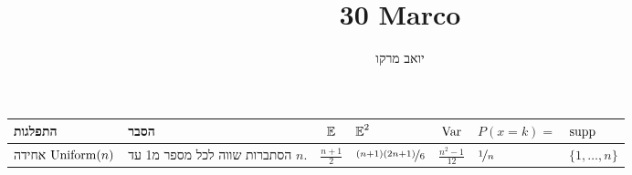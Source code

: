\documentclass[8pt,twocolumn]{extarticle}
\title{30 Marco}
\author{יואב מרקו}
\begin{document}
\ifxetex
{\centering
  { \begin{minipage}{\columnwidth}
      \centering
      \begin{sideways}
        \begin{tabular}{ R{1.7cm} | R{2.8cm} | c | C{2.1cm} | c | C{2.1cm} | C{1.5cm}}
          התפלגות  & הסבר
          & $\operatorname*{\mathbb{E}}$ & $\operatorname*{\mathbb{E}}^2$ & $\operatorname{Var}$ & $P(x=k) =$ & $\operatorname{supp}$ \\
          \hline
          אחידה
          \null\hspace*{\fill}\(\operatorname{Uniform}(n)\)
                   & הסתברות שווה לכל מספר מ1 עד ‎\(n\).
          & ‎\(\frac{n+1}{2}\)
                  & ‎\(\nicefrac{(n+1)(2n+1)}{6}\)
                            & ‎\(\frac{n^2 -1}{12}\)
                                     & ‎\(\nicefrac{1}{n}\)
                                                  & ‎\(\{1, \dots ,n\}\)\\


\end{tabular}
\end{sideways}
\end{minipage}}}
\end{document}
